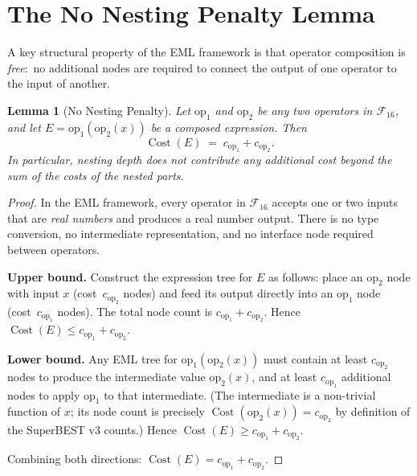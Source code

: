 \documentclass[12pt,a4paper]{article}
\newtheorem{lemma}[theorem]{Lemma}
\theoremstyle{definition}
\newcommand{\Cost}{\operatorname{Cost}}
\begin{document}
\section{The No Nesting Penalty Lemma}
\label{sec:nesting}

A key structural property of the EML framework is that operator composition
is \emph{free}:\ no additional nodes are required to connect the output of
one operator to the input of another.

\begin{lemma}[No Nesting Penalty]
\label{lem:nesting}
Let $\mathrm{op}_1$ and $\mathrm{op}_2$ be any two operators in
$\mathcal{F}_{16}$, and let $E = \mathrm{op}_1(\mathrm{op}_2(x))$ be a
composed expression.  Then
\[
  \Cost(E) \;=\; c_{\mathrm{op}_1} + c_{\mathrm{op}_2}.
\]
In particular, nesting depth does not contribute any additional cost
beyond the sum of the costs of the nested parts.
\end{lemma}

\begin{proof}
In the EML framework, every operator in $\mathcal{F}_{16}$ accepts one or
two inputs that are \emph{real numbers} and produces a real number output.
There is no type conversion, no intermediate representation, and no
interface node required between operators.

\medskip
\noindent\textbf{Upper bound.}
Construct the expression tree for $E$ as follows: place an $\mathrm{op}_2$
node with input $x$ (cost~$c_{\mathrm{op}_2}$ nodes) and feed its output
directly into an $\mathrm{op}_1$ node (cost~$c_{\mathrm{op}_1}$ nodes).
The total node count is $c_{\mathrm{op}_1} + c_{\mathrm{op}_2}$.
Hence $\Cost(E) \leq c_{\mathrm{op}_1} + c_{\mathrm{op}_2}$.

\medskip
\noindent\textbf{Lower bound.}
Any EML tree for $\mathrm{op}_1(\mathrm{op}_2(x))$ must contain at least
$c_{\mathrm{op}_2}$ nodes to produce the intermediate value
$\mathrm{op}_2(x)$, and at least $c_{\mathrm{op}_1}$ additional nodes to
apply $\mathrm{op}_1$ to that intermediate.
(The intermediate is a non-trivial function of $x$; its node count is
precisely $\Cost(\mathrm{op}_2(x)) = c_{\mathrm{op}_2}$ by definition of the
SuperBEST v3 counts.)
Hence $\Cost(E) \geq c_{\mathrm{op}_1} + c_{\mathrm{op}_2}$.

\medskip
\noindent Combining both directions: $\Cost(E) = c_{\mathrm{op}_1} + c_{\mathrm{op}_2}$.
\end{proof}
\end{document}

